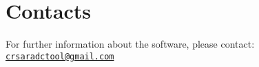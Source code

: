 \label{contacts}

\section{Contacts}
For further information about the software, please contact: \href{mailto:crsaradctool@gmail.com}{\nolinkurl{crsaradctool@gmail.com}}